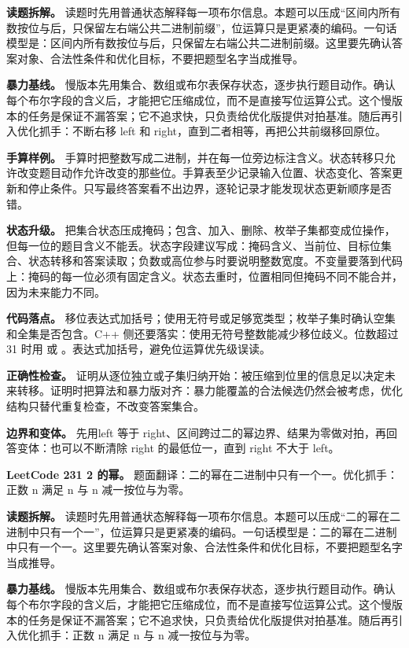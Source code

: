 \textbf{读题拆解。} 读题时先用普通状态解释每一项布尔信息。本题可以压成“区间内所有数按位与后，只保留左右端公共二进制前缀”，位运算只是更紧凑的编码。一句话模型是：区间内所有数按位与后，只保留左右端公共二进制前缀。这里要先确认答案对象、合法性条件和优化目标，不要把题型名字当成推导。

\textbf{暴力基线。} 慢版本先用集合、数组或布尔表保存状态，逐步执行题目动作。确认每个布尔字段的含义后，才能把它压缩成位，而不是直接写位运算公式。这个慢版本的任务是保证不漏答案；它不追求快，只负责给优化版提供对拍基准。随后再引入优化抓手：不断右移 left 和 right，直到二者相等，再把公共前缀移回原位。

\textbf{手算样例。} 手算时把整数写成二进制，并在每一位旁边标注含义。状态转移只允许改变题目动作允许改变的那些位。手算表至少记录输入位置、状态变化、答案更新和停止条件。只写最终答案看不出边界，逐轮记录才能发现状态更新顺序是否错。

\textbf{状态升级。} 把集合状态压成掩码；包含、加入、删除、枚举子集都变成位操作，但每一位的题目含义不能丢。状态字段建议写成：掩码含义、当前位、目标位集合、状态转移和答案读取；负数或高位参与时要说明整数宽度。不变量要落到代码上：掩码的每一位必须有固定含义。状态去重时，位置相同但掩码不同不能合并，因为未来能力不同。

\textbf{代码落点。} 移位表达式加括号；使用无符号或足够宽类型；枚举子集时确认空集和全集是否包含。C++ 侧还要落实：使用无符号整数能减少移位歧义。位数超过 31 时用  或 。表达式加括号，避免位运算优先级误读。

\textbf{正确性检查。} 证明从逐位独立或子集归纳开始：被压缩到位里的信息足以决定未来转移。证明时把算法和暴力版对齐：暴力能覆盖的合法候选仍然会被考虑，优化结构只替代重复检查，不改变答案集合。

\textbf{边界和变体。} 先用left 等于 right、区间跨过二的幂边界、结果为零做对拍，再回答变体：也可以不断清除 right 的最低位一，直到 right 不大于 left。

\noindent\textbf{LeetCode 231 2 的幂。} 题面翻译：二的幂在二进制中只有一个一。优化抓手：正数 n 满足 n 与 n 减一按位与为零。

\textbf{读题拆解。} 读题时先用普通状态解释每一项布尔信息。本题可以压成“二的幂在二进制中只有一个一”，位运算只是更紧凑的编码。一句话模型是：二的幂在二进制中只有一个一。这里要先确认答案对象、合法性条件和优化目标，不要把题型名字当成推导。

\textbf{暴力基线。} 慢版本先用集合、数组或布尔表保存状态，逐步执行题目动作。确认每个布尔字段的含义后，才能把它压缩成位，而不是直接写位运算公式。这个慢版本的任务是保证不漏答案；它不追求快，只负责给优化版提供对拍基准。随后再引入优化抓手：正数 n 满足 n 与 n 减一按位与为零。

